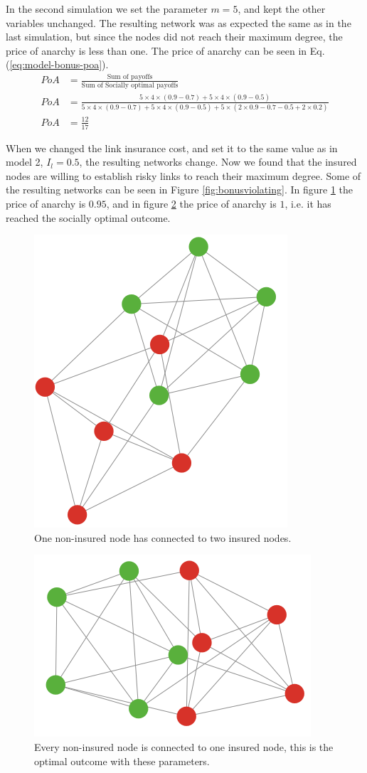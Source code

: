 In the second simulation we set the parameter $m=5$, and kept the other variables unchanged. The resulting network was as expected the same as in the last simulation, but since the nodes did not reach their maximum degree, the price of anarchy is less than one. The price of anarchy can be seen in Eq.(\ref{eq:model-bonus-poa}).
\begin{eqnarray}
PoA&=\frac{\text{Sum of payoffs}}{\text{Sum of Socially optimal payoffs}}  \nonumber \\
PoA&=\frac{5\times 4\times (0.9-0.7)+5\times 4\times(0.9-0.5)}{5\times 4\times (0.9-0.7)+5\times 4\times(0.9-0.5)+5\times (2\times 0.9-0.7-0.5 + 2 \times 0.2)}\nonumber \\
PoA&=\frac{12}{17}
\label{eq:model-bonus-poa}
\end{eqnarray}

When we changed the link insurance cost, and set it to the same value as in model 2, $I_{l}=0.5$, the resulting networks change. Now we found that the insured nodes are willing to establish risky links to reach their maximum degree. Some of the resulting networks can be seen in Figure \ref{fig:bonusviolating}.
In figure \ref{fig:bonusvolating:a} the price of anarchy is $0.95$, and in figure \ref{fig:bonusvolating:b} the price of anarchy is $1$, i.e. it has reached the socially optimal outcome.

\begin{figure}
  \centering
  \includegraphics[width=0.55\linewidth]{../Figures/BonusGameViolating.png}
  \caption{\label{fig:bonusvolating:a} One non-insured node has connected to two insured nodes.}
\end{figure}
\quad
\begin{figure}
  \centering
  \includegraphics[width=0.55\linewidth]{../Figures/BonusGameViolatingOptimal.png}
  \caption{\label{fig:bonusvolating:b}Every non-insured node is connected to one insured node, this is the optimal outcome with these parameters.}
\end{figure}
  
